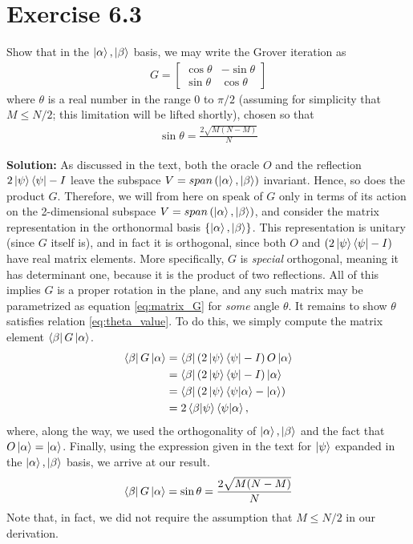 \documentclass{book}
\begin{document}
\section*{Exercise 6.3}
    Show that in the $\ket{\alpha}, \ket{\beta}$ basis, we may write the Grover iteration as
    \begin{align}
        G = 
        \begin{bmatrix} \label{eq:matrix_G}
            \cos\theta & -\sin\theta \\
            \sin\theta & \cos\theta
        \end{bmatrix}
    \end{align}
    where $\theta$ is a real number in the range 0 to $\pi/2$ (assuming for simplicity that $M\leq N/2$; this limitation will be lifted shortly), chosen so that
    \begin{align} \label{eq:theta_value}
        \sin\theta =\frac{2\sqrt{M(N-M)}}{N}
    \end{align}
    
    \textbf{Solution:} As discussed in the text, both the oracle $O$ and the reflection $2\ket{\psi}\bra{\psi}-I$ leave the subspace $V = span\left(\ket{\alpha},\ket{\beta}\right)$ invariant. Hence, so does the product $G$. Therefore, we will from here on speak of $G$ only in terms of its action on the 2-dimensional subspace $V = span\left(\ket{\alpha},\ket{\beta}\right)$, and consider the matrix representation in the orthonormal basis $\{\ket{\alpha},\ket{\beta}\}$. This representation is unitary (since $G$ itself is), and in fact it is orthogonal, since both $O$ and $(2\ket{\psi}\bra{\psi}-I)$ have real matrix elements. More specifically, $G$ is \emph{special} orthogonal, meaning it has determinant one, because it is the product of two reflections. All of this implies $G$ is a proper rotation in the plane, and any such matrix may be parametrized as equation \eqref{eq:matrix_G} for \emph{some} angle $\theta$. It remains to show $\theta$ satisfies relation \eqref{eq:theta_value}. To do this, we simply compute the matrix element $\bra{\beta}G\ket{\alpha}$.
    \begin{align}
    \begin{aligned}
        \bra{\beta}G\ket{\alpha} &= \bra{\beta}\left(2\ket{\psi}\bra{\psi}-I\right)O\ket{\alpha} \\
        &=\bra{\beta}\left(2\ket{\psi}\bra{\psi}-I\right)\ket{\alpha}\\
        &=\bra{\beta}\left(2\ket{\psi}\braket{\psi}{\alpha}-\ket{\alpha}\right) \\
        &=2\braket{\beta}{\psi}\braket{\psi}{\alpha},
    \end{aligned}
    \end{align}
    where, along the way, we used the orthogonality of $\ket{\alpha},\ket{\beta}$ and the fact that $O\ket{\alpha} = \ket{\alpha}$. Finally, using the expression given in the text for $\ket{\psi}$ expanded in the $\ket{\alpha},\ket{\beta}$ basis, we arrive at our result. 
    \begin{align}
        \bra{\beta}G\ket{\alpha} = \sin\theta = \frac{2\sqrt{M(N-M)}}{N}
    \end{align}
    Note that, in fact, we did not require the assumption that $M\leq N/2$ in our derivation.
\end{document}
